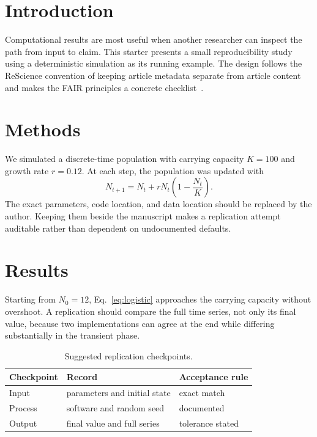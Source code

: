 \documentclass{rescience}
\begin{document}


\section{Introduction}
Computational results are most useful when another researcher can inspect the
path from input to claim. This starter presents a small reproducibility study
using a deterministic simulation as its running example. The design follows
the ReScience convention of keeping article metadata separate from article
content and makes the FAIR principles a concrete checklist~\parencite{wilkinson2016}.

\section{Methods}
We simulated a discrete-time population with carrying capacity $K=100$ and
growth rate $r=0.12$. At each step, the population was updated with
\begin{equation}
  N_{t+1}=N_t+rN_t\left(1-\frac{N_t}{K}\right).
  \label{eq:logistic}
\end{equation}
The exact parameters, code location, and data location should be replaced by
the author. Keeping them beside the manuscript makes a replication attempt
auditable rather than dependent on undocumented defaults.

\section{Results}
Starting from $N_0=12$, Eq.~\eqref{eq:logistic} approaches the carrying
capacity without overshoot. A replication should compare the full time series,
not only its final value, because two implementations can agree at the end
while differing substantially in the transient phase.

\begin{table}[ht]
\centering
\caption{Suggested replication checkpoints.}
\begin{tabular}{lll}
\toprule
Checkpoint & Record & Acceptance rule \\
\midrule
Input & parameters and initial state & exact match \\
Process & software and random seed & documented \\
Output & final value and full series & tolerance stated \\
\bottomrule
\end{tabular}
\end{table}
\end{document}
